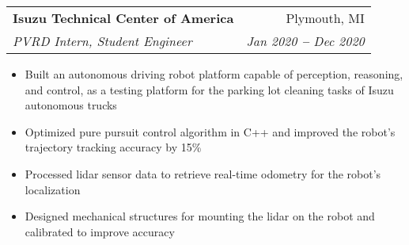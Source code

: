 \documentclass[letterpaper,11pt]{article}
\makeatletter
\newcommand{\resumeItem}[1]{
  \item\small{
    {#1 \vspace{-2pt}}
  }
}
\newcommand{\resumeSubheading}[4]{
  \vspace{-2pt}\item
    \begin{tabular*}{0.97\textwidth}[t]{l@{\extracolsep{\fill}}r}
      \textbf{#1} & #2 \\
      \textit{\small#3} & \textit{\small #4} \\
    \end{tabular*}\vspace{-7pt}
}
\newcommand{\resumeItemListStart}{\begin{itemize}}
\newcommand{\resumeItemListEnd}{\end{itemize}\vspace{-5pt}}
\makeatother
\begin{document}
    \resumeSubheading
      {Isuzu Technical Center of America}{Plymouth, MI}
      {PVRD Intern, Student Engineer}{Jan 2020 \textbf{--} Dec 2020}
        \resumeItemListStart
            \resumeItem{Built an autonomous driving robot platform capable of perception, reasoning, and control, as a testing platform for the parking lot cleaning tasks of Isuzu autonomous trucks }
            \resumeItem{Optimized pure pursuit control algorithm in C++ and improved the robot’s trajectory tracking accuracy by 15\%}
            \resumeItem{Processed lidar sensor data to retrieve real-time odometry for the robot's localization}
            \resumeItem{Designed mechanical structures for mounting the lidar on the robot and calibrated to improve accuracy}
        \resumeItemListEnd

\end{document}
